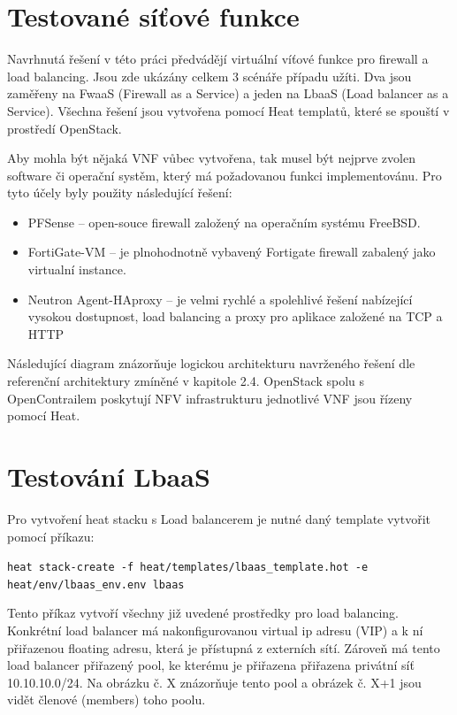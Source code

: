\section{Testované síťové funkce}\label{sub:interaction}

Navrhnutá řešení v této práci předvádějí virtuální víťové funkce pro firewall a load balancing. Jsou zde ukázány celkem 3 scénáře případu užíti. Dva jsou zaměřeny na FwaaS (Firewall as a Service) a jeden na LbaaS (Load balancer as a Service). Všechna řešení jsou vytvořena pomocí Heat templatů, které se spouští v prostředí OpenStack.

Aby mohla být nějaká VNF vůbec vytvořena, tak musel být nejprve zvolen software či operační systěm, který má požadovanou funkci implementovánu. Pro tyto účely byly použity následující řešení:

\begin{itemize}
\item PFSense – open-souce firewall založený na operačním systému FreeBSD.
\item FortiGate-VM – je plnohodnotně vybavený Fortigate firewall zabalený jako virtualní instance.
\item Neutron Agent-HAproxy – je velmi rychlé a spolehlivé řešení nabízející vysokou dostupnost, load balancing a proxy pro aplikace založené na TCP a HTTP
\end{itemize}

Následující diagram znázorňuje logickou architekturu navrženého řešení dle referenční architektury zmíněné v kapitole 2.4. OpenStack spolu s OpenContrailem poskytují NFV infrastrukturu jednotlivé VNF jsou řízeny pomocí Heat.


\section{Testování LbaaS}\label{sub:interaction}

Pro vytvoření heat stacku s Load balancerem je nutné daný template vytvořit pomocí příkazu:

\verb!heat stack-create -f heat/templates/lbaas_template.hot -e heat/env/lbaas_env.env lbaas!

Tento příkaz vytvoří všechny již uvedené prostředky pro load balancing. Konkrétní load balancer má nakonfigurovanou virtual ip adresu (VIP) a k ní přiřazenou floating adresu, která je přístupná z externích sítí. Zároveň má tento load balancer přiřazený pool, ke kterému je přiřazena přiřazena privátní síť 10.10.10.0/24. Na obrázku č. X znázorňuje tento pool a obrázek č. X+1 jsou vidět členové (members) toho poolu.

